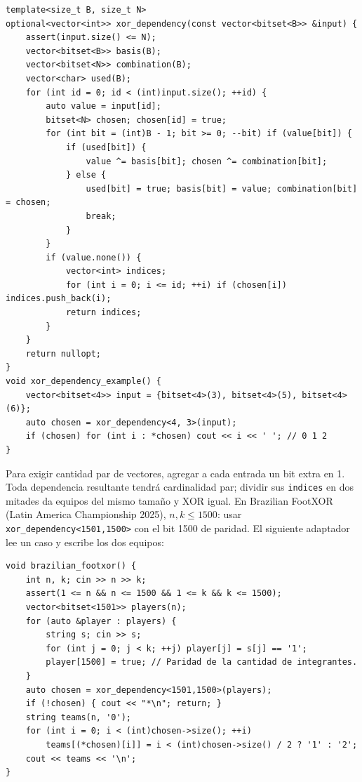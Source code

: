 \begin{lstlisting}[style=cpp]
template<size_t B, size_t N>
optional<vector<int>> xor_dependency(const vector<bitset<B>> &input) {
    assert(input.size() <= N);
    vector<bitset<B>> basis(B);
    vector<bitset<N>> combination(B);
    vector<char> used(B);
    for (int id = 0; id < (int)input.size(); ++id) {
        auto value = input[id];
        bitset<N> chosen; chosen[id] = true;
        for (int bit = (int)B - 1; bit >= 0; --bit) if (value[bit]) {
            if (used[bit]) {
                value ^= basis[bit]; chosen ^= combination[bit];
            } else {
                used[bit] = true; basis[bit] = value; combination[bit] = chosen;
                break;
            }
        }
        if (value.none()) {
            vector<int> indices;
            for (int i = 0; i <= id; ++i) if (chosen[i]) indices.push_back(i);
            return indices;
        }
    }
    return nullopt;
}
void xor_dependency_example() {
    vector<bitset<4>> input = {bitset<4>(3), bitset<4>(5), bitset<4>(6)};
    auto chosen = xor_dependency<4, 3>(input);
    if (chosen) for (int i : *chosen) cout << i << ' '; // 0 1 2
}
\end{lstlisting}

Para exigir cantidad par de vectores, agregar a cada entrada un bit extra en 1.
Toda dependencia resultante tendr\'a cardinalidad par; dividir sus \texttt{indices}
en dos mitades da equipos del mismo tama\~no y XOR igual.
En Brazilian FootXOR (Latin America Championship 2025), $n,k\le1500$:
usar \texttt{xor\_dependency<1501,1500>} con el bit 1500 de paridad.
El siguiente adaptador lee un caso y escribe los dos equipos:

\begin{lstlisting}[style=cpp]
void brazilian_footxor() {
    int n, k; cin >> n >> k;
    assert(1 <= n && n <= 1500 && 1 <= k && k <= 1500);
    vector<bitset<1501>> players(n);
    for (auto &player : players) {
        string s; cin >> s;
        for (int j = 0; j < k; ++j) player[j] = s[j] == '1';
        player[1500] = true; // Paridad de la cantidad de integrantes.
    }
    auto chosen = xor_dependency<1501,1500>(players);
    if (!chosen) { cout << "*\n"; return; }
    string teams(n, '0');
    for (int i = 0; i < (int)chosen->size(); ++i)
        teams[(*chosen)[i]] = i < (int)chosen->size() / 2 ? '1' : '2';
    cout << teams << '\n';
}
\end{lstlisting}

